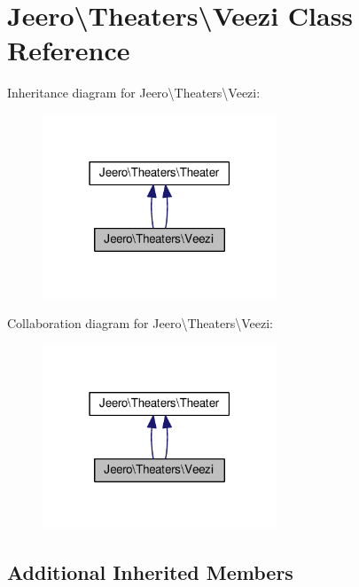 \hypertarget{classJeero_1_1Theaters_1_1Veezi}{}\section{Jeero\textbackslash{}Theaters\textbackslash{}Veezi Class Reference}
\label{classJeero_1_1Theaters_1_1Veezi}


Inheritance diagram for Jeero\textbackslash{}Theaters\textbackslash{}Veezi\+:\nopagebreak
\begin{figure}[H]
\begin{center}
\leavevmode
\includegraphics[width=198pt]{classJeero_1_1Theaters_1_1Veezi__inherit__graph}
\end{center}
\end{figure}


Collaboration diagram for Jeero\textbackslash{}Theaters\textbackslash{}Veezi\+:\nopagebreak
\begin{figure}[H]
\begin{center}
\leavevmode
\includegraphics[width=198pt]{classJeero_1_1Theaters_1_1Veezi__coll__graph}
\end{center}
\end{figure}
\subsection*{Additional Inherited Members}


